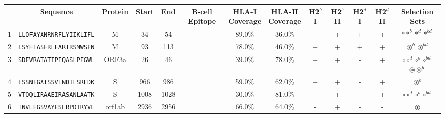 \begin{tabular}{rcccccccccccc}
\toprule
{} &                        Sequence & Protein &  Start &   End & B-cell Epitope & \Centerstack{HLA-I \\ Coverage} & \Centerstack{HLA-II \\ Coverage} & H2$^{b}$ I & H2$^{b}$ II & H2$^{d}$ I & H2$^{d}$ II &                                                                                                   Selection Sets \\
\midrule
1  &  \texttt{LLQFAYANRNRFLYIIKLIFL} &       M &     34 &    54 &                &                          89.0\% &                           36.0\% &          + &           + &          + &           + &                                                                                 $ \ast \ast^b \ast^d \ast^{bd} $ \\
2  &  \texttt{LSYFIASFRLFARTRSMWSFN} &       M &     93 &   113 &                &                          78.0\% &                           46.0\% &          + &           + &          + &           + &                                                                               $ \circledast^b \circledast^{bd} $ \\
3  &  \texttt{SDFVRATATIPIQASLPFGWL} &   ORF3a &     26 &    46 &                &                          39.0\% &                           78.0\% &          + &           + &          - &           + &                              \Centerstack{  $\circ \circ^d \circ^b \circ^{bd}$ \\  $\circledast \circledast^b$ } \\
4  &  \texttt{LSSNFGAISSVLNDILSRLDK} &       S &    966 &   986 &                &                          59.0\% &                           62.0\% &          + &           + &          - &           + &                                                                                                $ \circledast^b $ \\
5  &  \texttt{VTQQLIRAAEIRASANLAATK} &       S &   1008 &  1028 &                &                          30.0\% &                           81.0\% &          - &           + &          - &           + &                                                                             $ \circ \circ^d \circ^b \circ^{bd} $ \\
6  &  \texttt{TNVLEGSVAYESLRPDTRYVL} &  orf1ab &   2936 &  2956 &                &                          66.0\% &                           64.0\% &          - &           + &          - &           - &                                                                                                  $ \circledast $ \\

\end{tabular}
